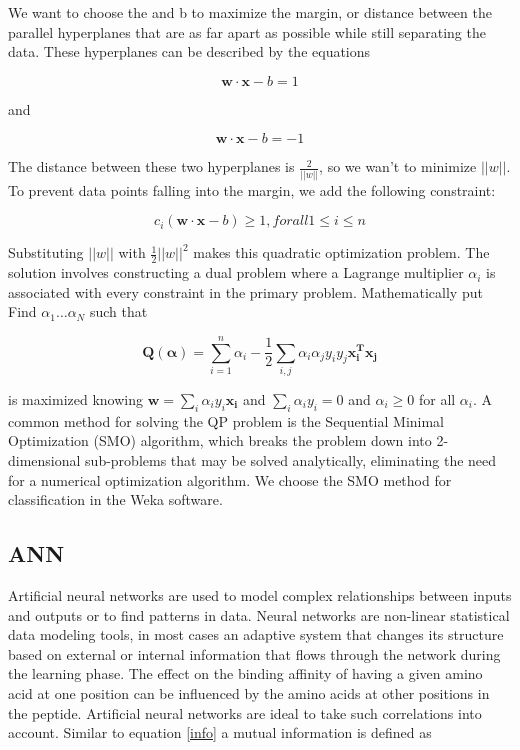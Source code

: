 We want to choose the  and b to maximize the margin, or distance between the parallel hyperplanes that are as far apart as possible while still separating the data. These hyperplanes can be described by the equations

\begin{equation}
\mathbf{w \cdot x} - b = 1
\end{equation}

and

\begin{equation}
\mathbf{w \cdot x} - b = -1
\end{equation}

The distance between these two hyperplanes is $\frac{2}{||w||}$, so we wan't to minimize $||w||$.
To prevent data points falling into the margin, we add the following constraint:

\begin{equation}
c_i(\mathbf{w \cdot x} - b) \geq 1, for all 1 \leq i \leq n
\end{equation}

Substituting $||w||$ with $\frac{1}{2}||w||^2$ makes this quadratic optimization problem. 
The solution involves constructing a dual problem where 
a Lagrange multiplier $\alpha_i$ 
is associated with every 
constraint in the primary problem. Mathematically put Find $\alpha_1…\alpha_N$
such that

\begin{equation}
\mathbf{Q(\alpha)} = \sum_{i=1}^{n}{\alpha_i} - \frac{1}{2}\sum_{i,j}{\alpha_i\alpha_j y_i y_j \mathbf{x_i^T x_j} }
\end{equation}

is maximized knowing $\mathbf{w} = \sum_{i}{ \alpha_i y_i \mathbf{x_i} }$ and $\sum_{i}{\alpha_i y_i} = 0$ and $\alpha_i \geq 0$ for all $\alpha_i$.  
A common method for solving the QP problem is the Sequential Minimal Optimization (SMO) algorithm, 
which breaks the problem down into 2-dimensional sub-problems that may be solved analytically, eliminating the need for a numerical optimization algorithm.
We choose the SMO method for classification in the Weka software.

\subsection*{ANN}
Artificial neural networks are used to model complex relationships between inputs and outputs or to find patterns in data.
Neural networks are non-linear statistical data modeling tools, in most cases an adaptive system that changes its structure based on external or internal information that flows through the network during the learning phase.
The effect on the binding affinity of
having a given amino acid at one
position can be influenced by the
amino acids at other positions in the
peptide. Artificial neural networks are
ideal to take such
correlations into account. Similar to equation \ref{info} a mutual information is defined as

